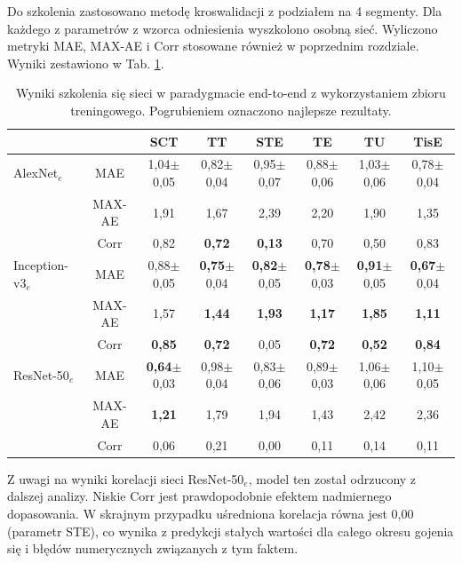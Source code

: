 Do szkolenia zastosowano metodę kroswalidacji z podziałem na 4 segmenty. Dla każdego z parametrów z wzorca odniesienia wyszkolono osobną sieć. Wyliczono metryki MAE, MAX-AE i Corr stosowane również w poprzednim rozdziale. Wyniki zestawiono w Tab. \ref{tab:end-to-endTrain}.
\vspace{10px}
\renewcommand{\arraystretch}{1.2}
\begin{table}[ht]
\scriptsize
\setlength{\tabcolsep}{1pt}
\centering
\caption{Wyniki szkolenia się sieci w paradygmacie end-to-end z wykorzystaniem zbioru treningowego. Pogrubieniem oznaczono najlepsze rezultaty.}
\label{tab:end-to-endTrain}
\begin{tabular}{lc||c|c|c|c|c|c}
	&& \textbf{SCT} & \textbf{TT} & \textbf{STE} & \textbf{TE} & \textbf{TU} & \textbf{TisE}\\ \hline \hline
	AlexNet$_{e}$ & MAE & 1,04$\pm$0,05 & 0,82$\pm$0,04 & 0,95$\pm$0,07 & 0,88$\pm$0,06 & 1,03$\pm$0,06 & 0,78$\pm$0,04  \\
	&MAX-AE & 1,91 & 1,67 & 2,39 & 2,20 & 1,90 & 1,35\\ 
	&Corr & 0,82 & \textbf{0,72} & \textbf{0,13} & 0,70 & 0,50 & 0,83 \\ \hline
	Inception-v3$_{e}$ & MAE & 0,88$\pm$0,05 & \textbf{0,75}$\pm$0,04 & \textbf{0,82}$\pm$0,05 & \textbf{0,78}$\pm$0,03 & \textbf{0,91}$\pm$0,05 & \textbf{0,67}$\pm$0,04 \\
	&MAX-AE & 1,57 & \textbf{1,44} & \textbf{1,93} & \textbf{1,17} & \textbf{1,85} & \textbf{1,11} \\ 
	&Corr & \textbf{0,85} & \textbf{0,72} & 0,05 & \textbf{0,72} & \textbf{0,52} & \textbf{0,84} \\ \hline
	ResNet-50$_{e}$ & MAE & \textbf{0,64}$\pm$0,03 & 0,98$\pm$0,04 & 0,83$\pm$0,06 & 0,89$\pm$0,03 & 1,06$\pm$0,06 & 1,10$\pm$0,05  \\
	&MAX-AE & \textbf{1,21} & 1,79 & 1,94 & 1,43 & 2,42 & 2,36\\
	&Corr & 0,06 & 0,21 & 0,00 & 0,11 & 0,14 & 0,11\\
	
	
\end{tabular}
\end{table}
\renewcommand{\arraystretch}{1}

Z uwagi na wyniki korelacji sieci ResNet-50$_{e}$, model ten został odrzucony z dalszej analizy. Niskie Corr jest prawdopodobnie efektem nadmiernego dopasowania. W skrajnym przypadku uśredniona korelacja równa jest 0,00 (parametr STE), co wynika z predykcji stałych wartości dla całego okresu gojenia się i błędów numerycznych związanych z tym faktem. 

